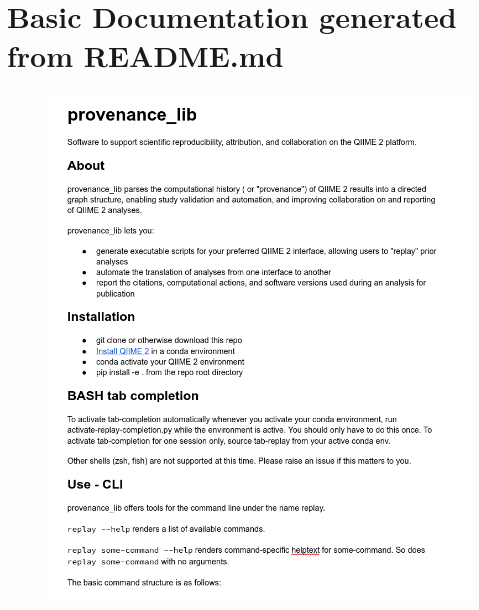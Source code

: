 \chapter{Basic Documentation generated from README.md}
\label{app:basicDocs}

\begin{figure}[htp]
\centering
\includegraphics[width=.95\textwidth]{figures/AppA1.png}
\end{figure}

